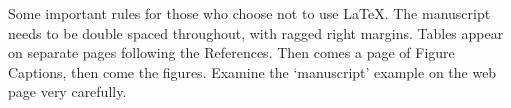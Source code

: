 \documentclass[doc]{apa}%
\begin{document}
Some important rules for those who choose not to use \LaTeX.  The manuscript needs to be double spaced throughout, with ragged right margins.  Tables appear on separate pages following the References.  Then comes a page of Figure Captions, then come the figures.  Examine the `manuscript' example on the web page very carefully.  



\end{document}
